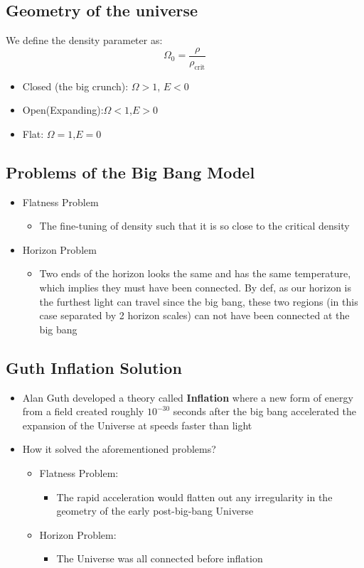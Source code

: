 \documentclass{article}
\begin{document}
\subsection{Geometry of the universe}
We define the density parameter as:
\begin{equation}
    \Omega_0=\frac{\rho}{\rho_\text{crit}}
\end{equation}
\begin{itemize}
    \item Closed (the big crunch): $\Omega>1$, $E<0$
    \item Open(Expanding):$\Omega<1$,$E>0$
    \item Flat: $\Omega=1$,$E=0$
\end{itemize}
\subsection{Problems of the Big Bang Model}
\begin{itemize}
    \item Flatness Problem
    \begin{itemize}
        \item The fine-tuning of density such that it is so close to the critical density
    \end{itemize}
    \item Horizon Problem
    \begin{itemize}
    \item Two ends of the horizon looks the same and has the same temperature, which implies they must have been connected. By def, as our horizon is the furthest light can travel since the big bang, these two regions (in this case separated by 2 horizon scales) can not have been connected at the big bang
\end{itemize}
\end{itemize}
\subsection{Guth Inflation Solution}
\begin{itemize}
    \item Alan Guth developed a theory called \textbf{Inflation} where a new form of energy from a field created roughly $10^{-30}$ seconds after the big bang accelerated the
expansion of the Universe at speeds faster than light 
    \item How it solved the aforementioned problems?
    \begin{itemize}
        \item Flatness Problem:
        \begin{itemize}
            \item  The rapid acceleration would flatten out any irregularity in the geometry of the early post-big-bang Universe
        \end{itemize}
        \item Horizon Problem:
        \begin{itemize}
            \item The Universe was all connected before inflation
        \end{itemize}
    \end{itemize}
\end{itemize}
\end{document}
